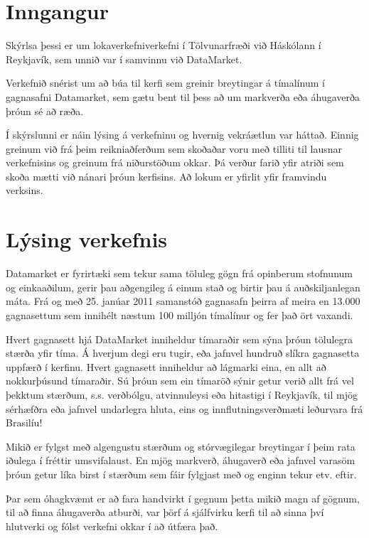 \documentclass{article}
\begin{document}
\tableofcontents
\newpage

\section{Inngangur}
Skýrlsa þessi er um lokaverkefniverkefni í Tölvunarfræði við Háskólann í
Reykjavík, 
sem unnið var í samvinnu við DataMarket.

Verkefnið snérist um að búa til kerfi sem greinir
breytingar á tímalínum í gagnasafni Datamarket, 
sem gætu bent til þess að um markverða eða áhugaverða þróun sé að ræða.

Í skýrslunni er náin lýsing á verkefninu og hvernig vekráætlun var háttað.
Einnig greinum við frá þeim reikniaðferðum sem skoðaðar voru með tilliti til 	
lausnar verkefnisins og greinum frá niðurstöðum okkar. Þá 
verður farið yfir atriði sem skoða mætti við nánari þróun kerfisins.
Að lokum er yfirlit yfir framvindu verksins.

\newpage
\section{Lýsing verkefnis}
Datamarket er fyrirtæki sem tekur sama töluleg gögn frá opinberum
stofnunum og einkaaðilum, gerir þau aðgengileg á einum stað og birtir þau á
auðskiljanlegan máta. Frá og með 25. janúar 2011 samanstóð gagnasafn þeirra 
af meira en 13.000 gagnasettum sem innihélt næstum 100 milljón tímalínur og 
fer það ört vaxandi.


Hvert gagnasett hjá DataMarket inniheldur tímaraðir sem sýna þróun tölulegra
stærða yfir tíma. 
Á hverjum degi eru tugir, eða jafnvel hundruð slíkra gagnasetta uppfærð í
kerfinu. 
Hvert gagnasett inniheldur að lágmarki eina, en allt að nokkurþúsund tímaraðir.
Sú		
þróun sem ein tímaröð sýnir getur verið allt frá vel
þekktum stærðum, s.s. verðbólgu, atvinnuleysi eða
hitastigi í Reykjavík, til mjög sérhæfðra eða jafnvel
undarlegra hluta, eins og innflutningsverðmæti
leðurvara frá Brasilíu!

Mikið er fylgst með algengustu stærðum og
stórvægilegar breytingar í þeim rata iðulega í fréttir	
umsvifalaust. En mjög markverð, áhugaverð eða jafnvel
varasöm þróun getur líka birst í stærðum sem fáir		
fylgjast með og enginn tekur etv. eftir. 

Þar sem óhagkvæmt er að fara handvirkt í gegnum þetta mikið magn af gögnum, 
til að finna áhugaverða atburði, var þörf á sjálfvirku kerfi til að 
sinna því hlutverki og fólst verkefni okkar í að útfæra það.
\end{document}
